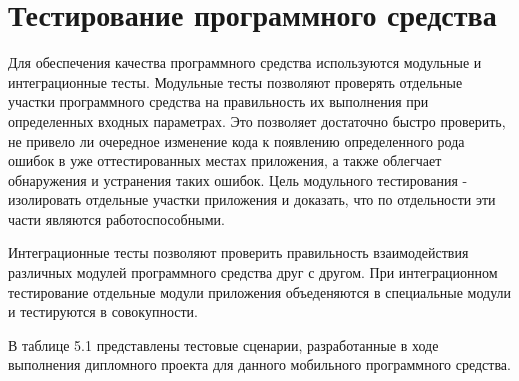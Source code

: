\section{Тестирование программного средства}
\label{sec:test}

Для обеспечения качества программного средства используются модульные и интеграционные тесты. Модульные тесты позволяют проверять отдельные участки программного средства на правильность их выполнения при определенных входных параметрах. Это позволяет достаточно быстро проверить, не привело ли очередное изменение кода к появлению определенного рода ошибок в уже оттестированных местах приложения, а также облегчает обнаружения и устранения таких ошибок. Цель модульного тестирования - изолировать отдельные участки приложения и доказать, что по отдельности эти части являются работоспособными. 

Интеграционные тесты позволяют проверить правильность взаимодействия различных модулей программного средства друг с другом. При интеграционном тестирование отдельные модули приложения объеденяются в специальные модули и тестируются в совокупности.

В таблице 5.1 представлены тестовые сценарии, разработанные в ходе выполнения дипломного проекта для данного мобильного программного средства.


